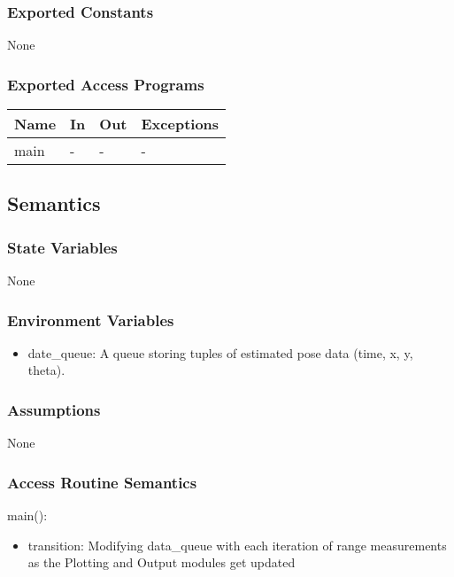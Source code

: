 \documentclass[12pt, titlepage]{article}
\begin{document}
\subsubsection{Exported Constants}
None

\subsubsection{Exported Access Programs}

\begin{center}
\begin{tabular}{p{2cm} p{4cm} p{4cm} p{2cm}}
\hline
\textbf{Name} & \textbf{In} & \textbf{Out} & \textbf{Exceptions} \\
\hline
main& - & - & - \\
\hline
\end{tabular}
\end{center}

\subsection{Semantics}

\subsubsection{State Variables}
None

\subsubsection{Environment Variables}
\begin{itemize}
  \item date\_queue: A queue storing tuples of estimated pose data (time, x, y, theta). 
\end{itemize}

\subsubsection{Assumptions}
None
  
\subsubsection{Access Routine Semantics}

\noindent main():
\begin{itemize}
\item transition: Modifying data\_queue with each iteration of range measurements as the Plotting and Output modules get updated 
\end{itemize}
\end{document}
